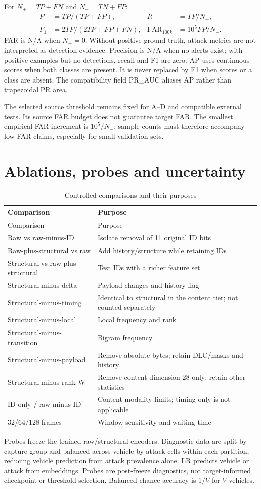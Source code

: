 \documentclass[12pt,a4paper,oneside,openany]{extbook}
\begin{document}
For $N_+=TP+FN$ and $N_-=TN+FP$:
\begin{align}
P&=TP/(TP+FP), & R&=TP/N_+,\\
F_1&=2TP/(2TP+FP+FN), & \operatorname{FAR}_{100k}&=10^5FP/N_-.
\end{align}
FAR is N/A when $N_-=0$. Without positive ground truth, attack metrics are not interpreted as detection evidence. Precision is N/A when no alerts exist; with positive examples but no detections, recall and F1 are zero. AP uses continuous scores when both classes are present. It is never replaced by F1 when scores or a class are absent. The compatibility field PR\_AUC aliases AP rather than trapezoidal PR area.

The selected source threshold remains fixed for A--D and compatible external tests. Its source FAR budget does not guarantee target FAR. The smallest empirical FAR increment is $10^5/N_-$; sample counts must therefore accompany low-FAR claims, especially for small validation sets.

\section{Ablations, probes and uncertainty}
\begin{longtable}{P{4cm}P{8.9cm}}
\caption{Controlled comparisons and their purposes}\label{tab:ablations}\\\toprule
Comparison & Purpose\\\midrule\endfirsthead\toprule Comparison & Purpose\\\midrule\endhead
Raw vs raw-minus-ID & Isolate removal of 11 original ID bits\\
Raw-plus-structural vs raw & Add history/structure while retaining IDs\\
Structural vs raw-plus-structural & Test IDs with a richer feature set\\
Structural-minus-delta & Payload changes and history flag\\
Structural-minus-timing & Identical to structural in the content tier; not counted separately\\
Structural-minus-local & Local frequency and rank\\
Structural-minus-transition & Bigram frequency\\
Structural-minus-payload & Remove absolute bytes; retain DLC/masks and history\\
Structural-minus-rank-W & Remove content dimension 28 only; retain other statistics\\
ID-only / raw-minus-ID & Content-modality limits; timing-only is not applicable\\
32/64/128 frames & Window sensitivity and waiting time\\\bottomrule
\end{longtable}
Probes freeze the trained raw/structural encoders. Diagnostic data are split by capture group and balanced across vehicle-by-attack cells within each partition, reducing vehicle prediction from attack prevalence alone. LR predicts vehicle or attack from embeddings. Probes are post-freeze diagnostics, not target-informed checkpoint or threshold selection. Balanced chance accuracy is $1/V$ for $V$ vehicles.
\end{document}
